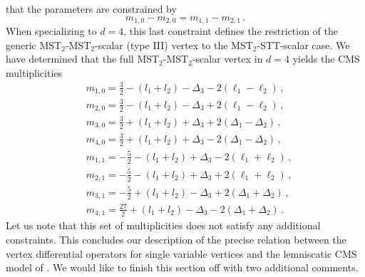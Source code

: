 \documentclass{article}
\def \Dg {\Delta}
\begin{document}
that the parameters are constrained by
\begin{equation}
m_{1,0}-m_{2,0} = m_{1,1}-m_{2,1}\,. \label{eq:addmconstraint}
\end{equation}
When specializing to $d=4$, this last constraint defines the restriction of the generic MST$_2$-MST$_2$-scalar (type III) vertex to the MST$_2$-STT-scalar case. We have determined that the full MST$_2$-MST$_2$-scalar vertex in $d=4$ yields the CMS multiplicities 
\begin{align}
& m_{1,0} = \frac{3}{2} -(l_1+l_2)-\Dg_3 -2(\ell_1-\ell_2)\,, \label{mMM410}\\
& m_{2,0} = \frac{3}{2}-(l_1+l_2)-\Dg_3 + 2(\ell_1-\ell_2)\,,  \label{mMM420}\\
& m_{3,0} = \frac{3}{2} + (l_1+l_2) +  \Dg_3 + 2 (\Dg_1-\Dg_2)\,,  \label{mMM430} \\
& m_{4,0} = \frac{3}{2} + (l_1+l_2)+ \Dg_3 -2(\Dg_1-\Dg_2)\,, \label{mMM440} \\
& m_{1,1} = - \frac{5}{2} - (l_1 + l_2) + \Dg_3 - 2(\ell_1+\ell_2)\,,  \label{mMM411}\\
& m_{2,1} = - \frac{5}{2} -( l_1 + l_2) + \Dg_3 + 2 (\ell_1+\ell_2)\,, \label{mMM421} \\
& m_{3,1} = - \frac{5}{2} + (l_1 +l_2) -  \Dg_3 + 2(\Dg_1+\Dg_2)\,,   \label{mMM431}\\
& m_{4,1} = \frac{27}{2} + (l_1+l_2) - \Dg_3 - 2(\Dg_1+\Dg_2)\,. \label{mMM441}
\end{align} 
Let us note that this set of multiplicities does not satisfy any additional 
constraints. This concludes our description of the precise relation between the 
vertex differential operators for single variable vertices and the 
lemniscatic CMS model of \cite{etingof2011107}. We would like 
to finish this section off with two additional comments.
\medskip 
\end{document}
